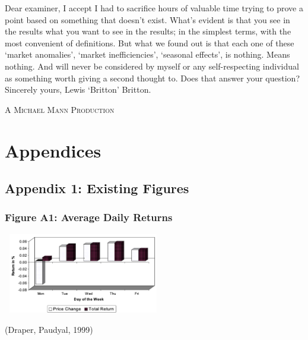 \documentclass[11pt, english]{article}
\begin{document}
	Dear examiner, I accept I had to sacrifice hours of valuable time trying to prove a point based on something that doesn't exist. What's evident is that you see in the results what you want to see in the results; in the simplest terms, with the most convenient of definitions. But what we found out is that each one of these `market anomalies', `market inefficiencies', `seasonal effects', is nothing. Means nothing. And will never be considered by myself or any self-respecting individual as something worth giving a second thought to. Does that answer your question? Sincerely yours, Lewis `Britton' Britton.

	\vspace{\fill}

	\begin{center}
		\textsc{A Michael Mann Production}
	\end{center}

\newpage



	\section*{Appendices}

	\subsection*{Appendix 1: Existing Figures}

		\subsubsection*{Figure A1: Average Daily Returns}
			
			\begin{center}
				\includegraphics[width=7cm,height=3.5cm]{A1.png} 
			\end{center}

			(Draper, Paudyal, 1999)
\end{document}
